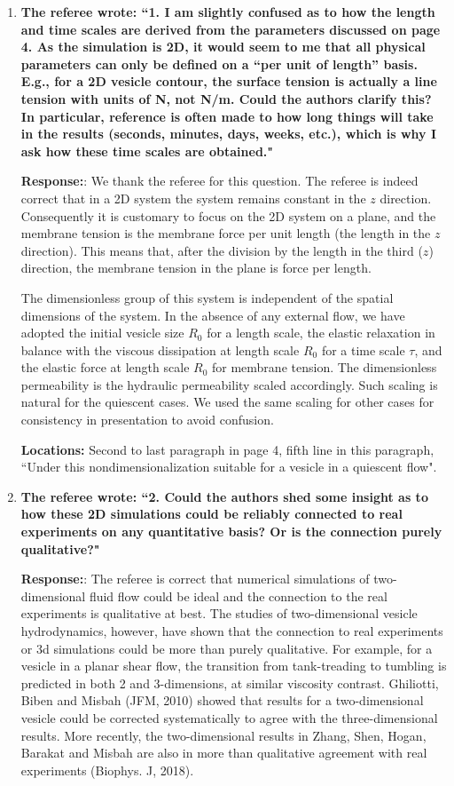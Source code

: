 \documentclass[11pt]{article}
\begin{document}
\begin{enumerate}

\item {\bf The referee wrote: ``1. I am slightly confused as to how the length and time scales are derived from the parameters discussed on page 4. As the simulation is 2D, it would seem to me that all physical parameters can only be defined on a “per unit of length” basis. E.g., for a 2D vesicle contour, the surface tension is actually a line tension with units of N, not N/m. Could the authors clarify this?
In particular, reference is often made to how long things will take in the results (seconds,
minutes, days, weeks, etc.), which is why I ask how these time scales are obtained."}

\noindent
{\bf Response:}: We thank the referee for this question. The referee is indeed correct that in a 2D system the system remains constant in the $z$ direction. Consequently it is customary to focus on the 2D system on a plane, and the membrane tension is the membrane force per unit length (the length in the $z$ direction). This means that, after the division by the length in the third ($z$) direction, the membrane tension in the plane is force per length. 

The dimensionless group of this system is independent of the spatial dimensions of the system. In the absence of any external flow, we have adopted the initial vesicle size $R_0$ for a length scale,  the elastic relaxation in balance with the viscous dissipation at  length scale $R_0$ for a time scale $\tau$, and the elastic force at length scale $R_0$ for membrane tension. The dimensionless permeability is the hydraulic permeability scaled accordingly. Such scaling is natural for the quiescent cases. We used the same scaling for other cases for consistency in presentation to avoid confusion.

\noindent
{\bf Locations:} Second to last paragraph in page 4, fifth line in this paragraph, ``Under this nondimensionalization suitable for a vesicle in a quiescent flow".


\item {\bf The referee wrote: ``2. Could the authors shed some insight as to how these 2D simulations could be reliably connected to real experiments on any quantitative basis? Or is the connection purely
qualitative?"}

\noindent
{\bf Response:}: The referee is correct that numerical simulations of two-dimensional fluid flow could be ideal and the connection to the real experiments is qualitative at best. The studies of two-dimensional vesicle hydrodynamics, however, have shown that the connection to real experiments or 3d simulations could be more than purely qualitative. For example, for a vesicle in a planar shear flow, the transition from tank-treading to tumbling is predicted in both 2 and 3-dimensions, at similar viscosity contrast. Ghiliotti, Biben and Misbah (JFM, 2010) showed that results for a two-dimensional vesicle could be corrected systematically to agree with the three-dimensional results. More recently, the two-dimensional results in Zhang, Shen, Hogan, Barakat and Misbah are also in more than qualitative agreement with real experiments (Biophys. J, 2018). 


\end{enumerate}
\end{document}
